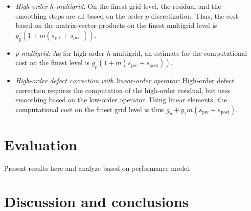 \documentclass[times]{nlaauth}
\begin{document}
\begin{itemize}
\item {\em High-order $h$-multigrid:} On the finest grid level, the
  residual and the smoothing steps are all based on the order $p$
  discretization. Thus, the cost based on the matrix-vector products
  on the finest multigrid level is
  $g_p(1+m(s_\text{pre}+s_\text{post}))$.

\item {\em $p$-multigrid:} As for high-order $h$-multigrid, an
  estimate for the computational cost on the finest level is
  $g_p(1+m(s_\text{pre}+s_\text{post}))$.

\item {\em High-order defect correction with linear-order operator:}
  High-order defect correction requires the computation of the
  high-order residual, but uses smoothing based on the low-order
  operator. Using linear elements, the computational cost on the
  finest grid level is thus
  $g_p+g_1m(s_\text{pre}+s_\text{post})$.


\end{itemize}





\section{Evaluation}

Present results here and analyze based on performance model.



\section{Discussion and conclusions}

\end{document}
